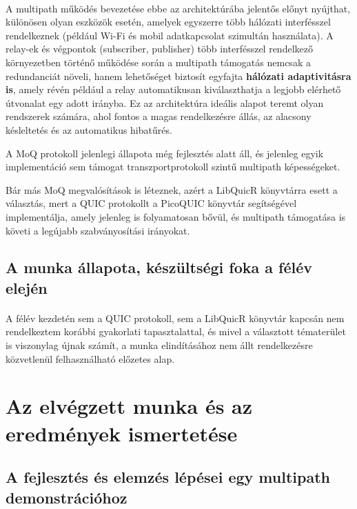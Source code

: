 \documentclass[a4paper,oneside]{article}
\begin{document}
\paragraph{}
A multipath működés bevezetése ebbe az architektúrába jelentős előnyt nyújthat, 
különösen olyan eszközök esetén, amelyek egyszerre több hálózati interfésszel 
rendelkeznek (például Wi-Fi és mobil adatkapcsolat szimultán használata). A relay-ek és végpontok 
(subscriber, publisher) több interfésszel rendelkező környezetben 
történő működése során a multipath támogatás nemcsak a redundanciát növeli, hanem 
lehetőséget biztosít egyfajta \textbf{hálózati adaptivitásra is}, amely révén például 
a relay automatikusan kiválaszthatja a legjobb elérhető útvonalat egy adott irányba. 
Ez az architektúra ideális alapot teremt olyan rendszerek számára, ahol fontos a magas 
rendelkezésre állás, az alacsony késleltetés és az automatikus hibatűrés.

A MoQ protokoll jelenlegi állapota még fejlesztés alatt áll, és jelenleg egyik implementáció
sem támogat transzportprotokoll szintű multipath képességeket.

Bár más MoQ megvalósítások is léteznek, azért a LibQuicR\cite{libquicr} könyvtárra esett a
választás, mert a QUIC protokollt a PicoQUIC könyvtár segítségével implementálja, amely
jelenleg is folyamatosan bővül, és multipath támogatása is követi a legújabb szabványosítási irányokat.

\subsection{A munka állapota, készültségi foka a félév elején}
\label{sec:munka-allap-kesz}
\paragraph{}
A félév kezdetén sem a QUIC protokoll, sem a LibQuicR könyvtár kapcsán nem 
rendelkeztem korábbi gyakorlati tapasztalattal, és mivel a választott 
tématerület is viszonylag újnak számít, a munka elindításához nem állt 
rendelkezésre közvetlenül felhasználható előzetes alap.

\newpage
\section{Az elvégzett munka és az eredmények ismertetése}
\label{sec:az-elvegzett-munka}


\subsection{A fejlesztés és elemzés lépései egy multipath demonstrációhoz}
\label{sec:a-munkam-ismert}
\end{document}
